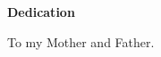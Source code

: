 \noindent
{\LARGE\textbf {Dedication}}

\vspace{9cm}

\begin{spacing}{1} 
\noindent

\begin{center}
To my Mother and Father.
\end{center}

\end{spacing}